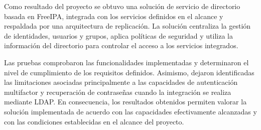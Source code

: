 Como resultado del proyecto se obtuvo una solución de servicio de directorio basada en FreeIPA, integrada con los servicios definidos en el alcance y respaldada por una arquitectura de replicación. La solución centraliza la gestión de identidades, usuarios y grupos, aplica políticas de seguridad y utiliza la información del directorio para controlar el acceso a los servicios integrados.

Las pruebas comprobaron las funcionalidades implementadas y determinaron el nivel de cumplimiento de los requisitos definidos. Asimismo, dejaron identificadas las limitaciones asociadas principalmente a las capacidades de autenticación multifactor y recuperación de contraseñas cuando la integración se realiza mediante LDAP. En consecuencia, los resultados obtenidos permiten valorar la solución implementada de acuerdo con las capacidades efectivamente alcanzadas y con las condiciones establecidas en el alcance del proyecto.
